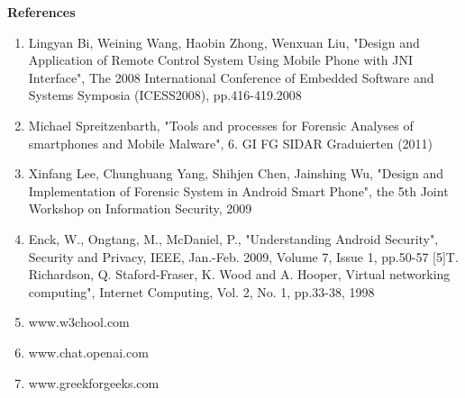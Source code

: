\documentclass[12pt]{article}
\begin{document}
\clearpage

\LARGE \textbf{References }\\[5mm]

\begin{enumerate}

\item  Lingyan Bi, Weining Wang, Haobin Zhong, Wenxuan Liu, "Design and 
Application of Remote Control System Using Mobile Phone with JNI Interface", The 
2008 International Conference of Embedded Software and Systems Symposia 
(ICESS2008), pp.416-419.2008 

\item Michael Spreitzenbarth, "Tools and processes for Forensic Analyses of 
smartphones and Mobile Malware", 6. GI FG SIDAR Graduierten 
(2011)

\item Xinfang Lee, Chunghuang Yang, Shihjen Chen, Jainshing Wu, "Design and 
Implementation of Forensic System in Android Smart Phone", the 5th Joint 
Workshop on Information Security, 2009 

\item Enck, W., Ongtang, M., McDaniel, P., "Understanding Android Security", Security 
and Privacy, IEEE, Jan.-Feb. 2009, Volume 7, Issue 1, pp.50-57 [5]T. Richardson, Q. 
Staford-Fraser, K. Wood and A. Hooper, Virtual networking computing", Internet 
Computing, Vol. 2, No. 1, pp.33-38, 1998 

\item  www.w3chool.com

\item  www.chat.openai.com

\item www.greekforgeeks.com

\end{enumerate}


 
\end{document}
